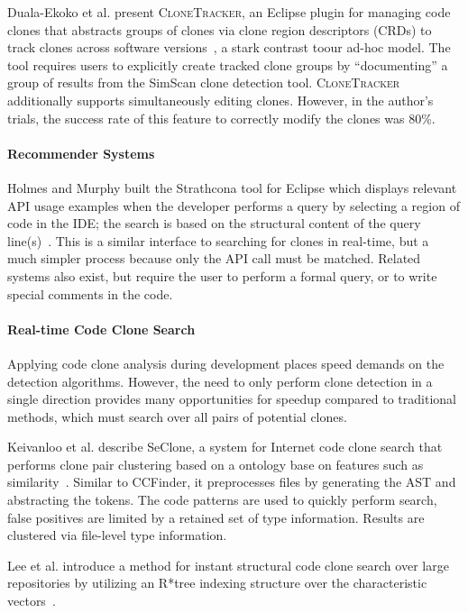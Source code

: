 \documentclass[nocopyrightspace,10pt]{sigplanconf}
\begin{document}
Duala-Ekoko et al. present \textsc{CloneTracker}, an Eclipse plugin
for managing code clones that abstracts groups of clones via clone
region descriptors (CRDs) to track clones across software
versions~\cite{Duala-Ekoko2007}, a stark contrast toour ad-hoc model.
 The tool requires users to explicitly
create tracked clone groups by ``documenting'' a group of results from
the SimScan clone detection tool. \textsc{CloneTracker} additionally
supports simultaneously editing clones. However, in the author's
trials, the success rate of this feature to correctly modify the
clones was 80\%.

\paragraph{Recommender Systems}

Holmes and Murphy built the Strathcona tool for Eclipse which displays
relevant API usage examples when the developer performs a query by
selecting a region of code in the IDE; the search is based on the
structural content of the query line(s)~\cite{Holmes2005}. 
This is a similar interface to searching for clones in real-time, but a
much simpler process because only the API call must be matched.
Related systems also exist, but require the user to
perform a formal query, or to write special comments in the code.

\paragraph{Real-time Code Clone Search}

Applying code clone analysis during development places speed demands
on the detection algorithms. However, the need to only perform clone
detection in a single direction provides many opportunities for
speedup compared to traditional methods, which must search
over all pairs of potential clones.

Keivanloo et al. describe SeClone, a system for Internet code clone
search that performs clone pair clustering based on a ontology base on
features such as similarity~\cite{Keivanloo2011}. Similar to CCFinder,
it preprocesses files by generating the AST and abstracting the
tokens. The code patterns are used to quickly perform search, false
positives are limited by a retained set of type information. Results
are clustered via file-level type information.

Lee et al. introduce a method for instant structural code clone search
over large repositories by utilizing an R*tree indexing structure over
the characteristic vectors~\cite{Lee2010}.
\end{document}
